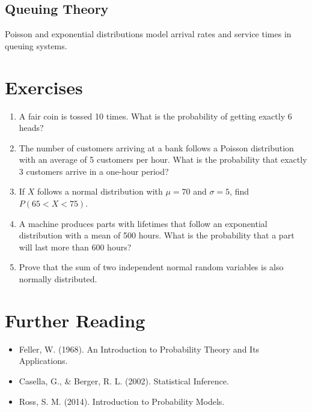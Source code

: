 \documentclass[12pt,a4paper]{article}
\begin{document}
\subsection{Queuing Theory}
Poisson and exponential distributions model arrival rates and service times in queuing systems.

\section{Exercises}
\begin{enumerate}
    \item A fair coin is tossed 10 times. What is the probability of getting exactly 6 heads?
    \item The number of customers arriving at a bank follows a Poisson distribution with an average of 5 customers per hour. What is the probability that exactly 3 customers arrive in a one-hour period?
    \item If $X$ follows a normal distribution with $\mu = 70$ and $\sigma = 5$, find $P(65 < X < 75)$.
    \item A machine produces parts with lifetimes that follow an exponential distribution with a mean of 500 hours. What is the probability that a part will last more than 600 hours?
    \item Prove that the sum of two independent normal random variables is also normally distributed.
\end{enumerate}

\section{Further Reading}
\begin{itemize}
    \item Feller, W. (1968). An Introduction to Probability Theory and Its Applications.
    \item Casella, G., \& Berger, R. L. (2002). Statistical Inference.
    \item Ross, S. M. (2014). Introduction to Probability Models.
\end{itemize}
\end{document}
